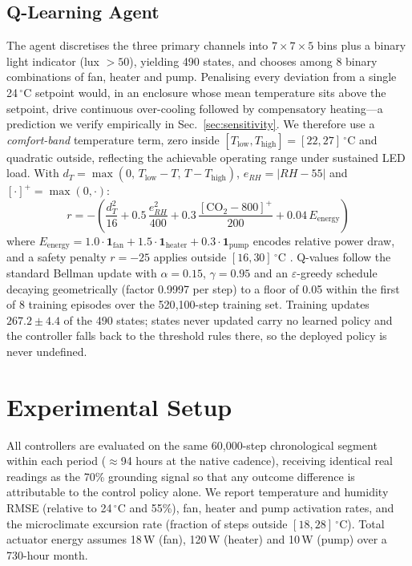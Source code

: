 \documentclass[conference]{IEEEtran}
\begin{document}
\subsection{Q-Learning Agent}
The agent discretises the three primary channels into $7\times7\times5$ bins plus
a binary light indicator (lux $>50$), yielding 490 states, and chooses among 8
binary combinations of fan, heater and pump. Penalising every deviation from a
single 24\,$^{\circ}$C setpoint would, in an enclosure whose mean temperature
sits above the setpoint, drive continuous over-cooling followed by compensatory
heating---a prediction we verify empirically in Sec.~\ref{sec:sensitivity}. We
therefore use a \emph{comfort-band} temperature term, zero inside
$[T_{\text{low}},T_{\text{high}}]=[22,27]\,^{\circ}$C and quadratic outside,
reflecting the achievable operating range under sustained LED load. With
$d_T=\max(0,\,T_{\text{low}}-T,\,T-T_{\text{high}})$,
$e_{\mathit{RH}}=|\mathit{RH}-55|$ and $[\cdot]^{+}=\max(0,\cdot)$:
\begin{equation}
r = -\!\left(\frac{d_T^{2}}{16}
+ 0.5\,\frac{e_{\mathit{RH}}^{2}}{400}
+ 0.3\,\frac{[\mathrm{CO_2}-800]^{+}}{200}
+ 0.04\,E_{\text{energy}}\right)
\end{equation}
where
$E_{\text{energy}}=1.0\cdot\mathbf{1}_{\text{fan}}+1.5\cdot\mathbf{1}_{\text{heater}}+0.3\cdot\mathbf{1}_{\text{pump}}$
encodes relative power draw, and a safety penalty $r=-25$ applies outside
$[16,30]\,^{\circ}$C \cite{ajagekar2022,chen2025}. Q-values follow the standard
Bellman update with $\alpha=0.15$, $\gamma=0.95$ and an $\varepsilon$-greedy
schedule decaying geometrically (factor 0.9997 per step) to a floor of 0.05
within the first of 8 training episodes over the 520{,}100-step training set.
Training updates $267.2\pm4.4$ of the 490 states; states never updated carry no
learned policy and the controller falls back to the threshold rules there, so the
deployed policy is never undefined.

\section{Experimental Setup}
All controllers are evaluated on the same 60{,}000-step chronological segment
within each period ($\approx$94 hours at the native cadence), receiving identical
real readings as the 70\% grounding signal so that any outcome difference is
attributable to the control policy alone. We report temperature and humidity RMSE
(relative to 24\,$^{\circ}$C and 55\%), fan, heater and pump activation rates,
and the microclimate excursion rate (fraction of steps outside
$[18,28]\,^{\circ}$C). Total actuator energy assumes 18\,W (fan), 120\,W (heater)
and 10\,W (pump) over a 730-hour month.
\end{document}
